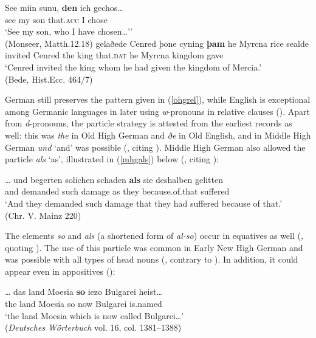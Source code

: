 \ea \label{ohgoe}
\ea \gll See miin sunu, \textbf{den} ich gechos\ldots \label{ohgrel}\\
see my son that.\textsc{acc} I chose\\
\glt `See my son, who I have chosen\ldots''\\(Monseer, Matth.12.18)
\ex \gll gelaðede Cenred þone cyning \textbf{þam} he Myrcna rice sealde\\
invited Cenred the king that.\textsc{dat} he Myrcna kingdom gave\\
\glt `Cenred invited the king whom he had given the kingdom of Mercia.'\\(Bede, Hist.Ecc. 464/7)
\z
\z

German still preserves the pattern given in (\ref{ohgrel}), while English is exceptional among Germanic languages in later using \textit{w}-pronouns in relative clauses (\citealt[134--135]{brandnerbraeuning2013}). Apart from \textit{d}-pronouns, the particle strategy is attested from the earliest records as well: this was \textit{the} in Old High German and \textit{ðe} in Old English, and in Middle High German \textit{und} `and' was possible (\citealt[135--136]{brandnerbraeuning2013}, citing \citealt{ferraresiweiss2011}). Middle High German also allowed the particle \textit{als} `as', illustrated in (\ref{mhgals}) below (\citealt[136, ex. 13]{brandnerbraeuning2013}, citing \citealt{ebertreichmannsolmswegera1993}):

\ea \gll \ldots{} und begerten solichen schaden \textbf{als} sie deshalben gelitten \label{mhgals}\\
{} and demanded such damage as they because.of.that suffered\\
\glt`And they demanded such damage that they had suffered because of that.'\\(Chr. V. Mainz 220)
\z

The elements \textit{so} and \textit{als} (a shortened form of \textit{al-so}) occur in equatives as well (\citealt[136]{brandnerbraeuning2013}, quoting \citealt{jaeger2010}). The use of this particle was common in Early New High German and was possible with all types of head nouns (\citealt[137]{brandnerbraeuning2013}, contrary to \citealt{paul1920band3}). In addition, it could appear even in appositives (\citealt[137, ex. 19]{brandnerbraeuning2013}):

\ea \gll \ldots{} das land Moesia \textbf{so} iezo Bulgarei heist\ldots\\
{} the land Moesia so now Bulgarei is.named\\
\glt `the land Moesia which is now called Bulgarei\ldots'\\(\textit{Deutsches Wörterbuch} vol. 16, col. 1381--1388)
\z

